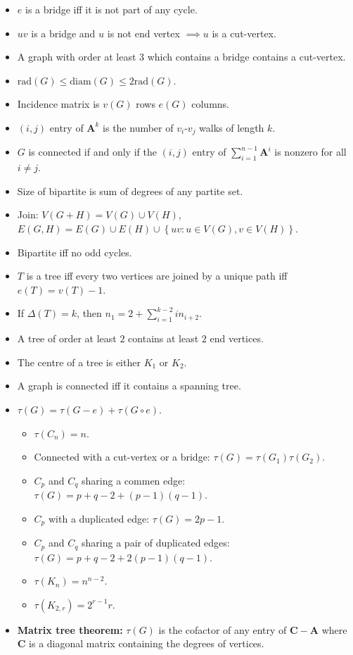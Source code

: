 \documentclass[11pt]{article}
\begin{document}
\begin{multicols*}{3}
\begin{itemize}
            \item $e$ is a bridge iff it is not part of any cycle.
            \item $uv$ is a bridge and $u$ is not end vertex $\implies u$ is a cut-vertex.
            \item A graph with order at least $3$ which contains a bridge contains a cut-vertex.
            \item $\mathrm{rad}(G) \leq \mathrm{diam}(G) \leq 2\mathrm{rad}(G)$.
            \item Incidence matrix is $v(G)$ rows $e(G)$ columns.
            \item $(i, j)$ entry of $\bm{A}^k$ is the number of $v_i$-$v_j$ walks of length $k$.
            \item $G$ is connected if and only if the $(i, j)$ entry of $\sum_{i = 1}^{n - 1}\bm{A}^i$ is nonzero for all $i \neq j$.
            \item Size of bipartite is sum of degrees of any partite set.
            \item Join: $V(G + H) = V(G) \cup V(H)$, $E(G, H) = E(G) \cup E(H) \cup \left\{uv \colon u \in V(G), v \in V(H)\right\}$.
            \item Bipartite iff no odd cycles.
            \item $T$ is a tree iff every two vertices are joined by a unique path iff $e(T) = v(T) - 1$.
            \item If $\Delta(T) = k$, then $n_1 = 2 + \sum_{i = 1}^{k - 2}in_{i + 2}$.
            \item A tree of order at least $2$ contains at least $2$ end vertices.
            \item The centre of a tree is either $K_1$ or $K_2$.
            \item A graph is connected iff it contains a spanning tree.
            \item $\tau(G) = \tau(G - e) + \tau(G \circ e)$.
            \begin{itemize}
                \item $\tau(C_n) = n$.
                \item Connected with a cut-vertex or a bridge: $\tau(G) = \tau(G_1)\tau(G_2)$.
                \item $C_p$ and $C_q$ sharing a commen edge: $\tau(G) = p + q - 2 + (p - 1)(q - 1)$.
                \item $C_p$ with a duplicated edge: $\tau(G) = 2p - 1$.
                \item $C_p$ and $C_q$ sharing a pair of duplicated edges: $\tau(G) = p + q - 2 + 2(p - 1)(q - 1)$.
                \item $\tau(K_n) = n^{n - 2}$.
                \item $\tau(K_{2, r}) = 2^{r - 1}r$.
            \end{itemize}
            \item \textbf{Matrix tree theorem:} $\tau(G)$ is the cofactor of any entry of $\bm{C - A}$ where $\bm{C}$ is a diagonal matrix containing the degrees of vertices.
        \end{itemize}
        
        
    \end{multicols*}
\end{document}
